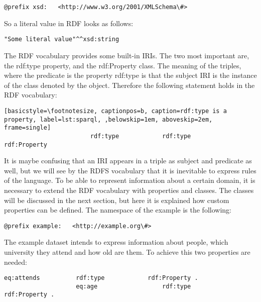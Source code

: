 \begin{lstlisting}[basicstyle=\footnotesize, captionpos=b, caption=XML Schema prefix, label=lst:sparql,belowskip=1em, aboveskip=2em,
frame=single]
@prefix xsd:   <http://www.w3.org/2001/XMLSchema\#>
\end{lstlisting}

So a literal value in RDF looks as follows:

\begin{lstlisting}[basicstyle=\footnotesize, captionpos=b, caption=String value as RDF data, label=lst:sparql,belowskip=1em, aboveskip=2em,
frame=single]
								"Some literal value"^^xsd:string
\end{lstlisting}

The RDF vocabulary provides some built-in IRIs. The two most important are, the rdf:type property, and the rdf:Property class. The meaning of the triples, where the predicate is the property rdf:type  is that the subject IRI is the instance of the class denoted by the object. Therefore the following statement holds in the RDF vocabulary:


\begin{lstlisting}[basicstyle=\footnotesize, captionpos=b, caption=rdf:type is a property, label=lst:sparql, ,belowskip=1em, aboveskip=2em,
frame=single]
						rdf:type		 	rdf:type			rdf:Property
\end{lstlisting}

It is maybe confusing that an IRI appears in a triple as subject and predicate as well, but we will see by the RDFS vocabulary that it is inevitable to express rules of the language.  
To be able to represent information about a certain domain, it is necessary to extend the RDF vocabulary with properties and classes. The classes will be discussed in the next section, but here it is explained how custom properties can be defined. The namespace of the example is the following: 


\begin{lstlisting}[basicstyle=\footnotesize, captionpos=b, caption=Example prefix, label=lst:sparql,belowskip=1em, aboveskip=2em,
frame=single]
@prefix example:   <http://example.org\#>
\end{lstlisting}

The example dataset intends to express information about people, which university they attend and how old are them. To achieve this two properties are needed:

\begin{lstlisting}[basicstyle=\footnotesize, captionpos=b, caption=Example properties, label=lst:sparql, belowskip=1em, aboveskip=2em,
frame=single]	
					eq:attends			rdf:type			rdf:Property .
					eq:age					rdf:type			rdf:Property .
\end{lstlisting}


